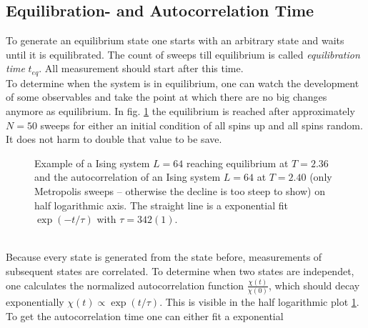 \subsection{Equilibration- and Autocorrelation Time}
\label{ssec:eqtime}
    To generate an equilibrium state one starts with an arbitrary state
    and waits until it is equilibrated. The count of sweeps till
    equilibrium is called \emph{equilibration time} \(t_{eq}\).
    All measurement should start after this time.\\
    To determine when the system is in equilibrium, one can watch the
    development of some observables and take the point at which there
    are no big changes anymore as equilibrium. In fig.
    \ref{fig:equiandauto}
    the equilibrium is reached after approximately \(N=50\) sweeps for
    either an initial condition of all spins up and all spins random. It
    does not harm to double that value to be save.
    \begin{figure}[htbp]
        \centering
        \caption[Examples for equilibration and autocorrelation]
        {
             Example of a Ising system
                \(L=64\) reaching equilibrium at \(T=2.36\) and
             the autocorrelation of an
                Ising system \(L=64\) at \(T=2.40\) (only Metropolis
                sweeps -- otherwise the decline is too steep to show)
                on half logarithmic axis.
                The straight line is a exponential fit \(\exp(-t/\tau)\)
                with \(\tau = 342(1)\).
        }
        \label{fig:equiandauto}
    \end{figure}\\
    Because every state is generated from the state before, measurements
    of subsequent states are correlated. To determine when two states
    are independet, one calculates the normalized autocorrelation function
    \(\frac{\chi(t)}{\chi(0)}\), which should decay exponentially
    \(\chi(t) \propto \exp(t/\tau)\). This is visible in the half
    logarithmic plot \ref{fig:equiandauto}.
    To get the autocorrelation time one can either fit a exponential
